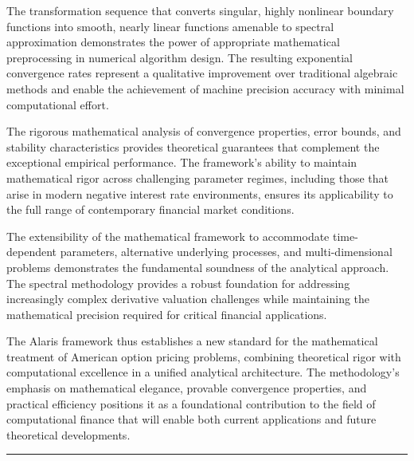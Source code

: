 \documentclass[
  11pt,
  11pt,
  letterpaper,
  onecolumn]{article}
\begin{document}
The transformation sequence that converts singular, highly nonlinear
boundary functions into smooth, nearly linear functions amenable to
spectral approximation demonstrates the power of appropriate
mathematical preprocessing in numerical algorithm design. The resulting
exponential convergence rates represent a qualitative improvement over
traditional algebraic methods and enable the achievement of machine
precision accuracy with minimal computational effort.

The rigorous mathematical analysis of convergence properties, error
bounds, and stability characteristics provides theoretical guarantees
that complement the exceptional empirical performance. The framework's
ability to maintain mathematical rigor across challenging parameter
regimes, including those that arise in modern negative interest rate
environments, ensures its applicability to the full range of
contemporary financial market conditions.

The extensibility of the mathematical framework to accommodate
time-dependent parameters, alternative underlying processes, and
multi-dimensional problems demonstrates the fundamental soundness of the
analytical approach. The spectral methodology provides a robust
foundation for addressing increasingly complex derivative valuation
challenges while maintaining the mathematical precision required for
critical financial applications.

The Alaris framework thus establishes a new standard for the
mathematical treatment of American option pricing problems, combining
theoretical rigor with computational excellence in a unified analytical
architecture. The methodology's emphasis on mathematical elegance,
provable convergence properties, and practical efficiency positions it
as a foundational contribution to the field of computational finance
that will enable both current applications and future theoretical
developments.

\begin{center}\rule{0.5\linewidth}{0.5pt}\end{center}


\printbibliography
\end{document}
